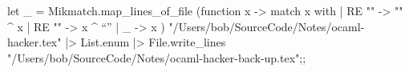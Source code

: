 \begin{enumerate}
\begin{enumerate}[(a)]
\begin{ocamlcode}
let _  = Mikmatch.map_lines_of_file  
  (function x -> 
    match x with 
      | RE "" -> "\n" ^ x 
      | RE "" -> x ^ ``\n'' 
      | _  -> x  )
  "/Users/bob/SourceCode/Notes/ocaml-hacker.tex"  
  |> List.enum 
  |> File.write_lines "/Users/bob/SourceCode/Notes/ocaml-hacker-back-up.tex";;
\end{ocamlcode}

\end{enumerate}

\end{enumerate}

